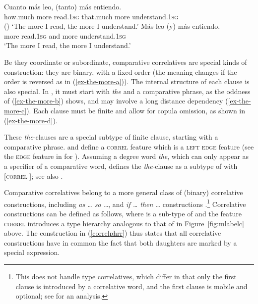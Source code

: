 \eal
\label{spanishab}
\ex 
\label{ex-spanish-a}
\gll Cuanto   m\'{a}s leo,     (tanto)        m\'{a}s entiendo. \\
     how.much more    read.1\textsc{sg} \hphantom{(}that.much more understand.1\textsc{sg} \\\hfill{()}
\glt `The more I read, the more I understand.'
\ex 
\label{ex-spanish-b}
\gll	M\'{a}s leo        (y) m\'{a}s entiendo.\\
	more read.1\textsc{sg} \hphantom{(}and more understand.1\textsc{sg} \\
\glt `The more I read, the more I understand.'\\ 
\zl

Be they coordinate or subordinate, comparative correlatives are special kinds of construction: they
are binary, with a fixed order (the meaning changes if the order is reversed as in
(\ref{ex-the-more-a})). The internal structure of each clause is also special. In , it
must start with \emph{the} and a comparative phrase, as the oddness of (\ref{ex-the-more-b}) shows,
and may involve a long distance dependency (\ref{ex-the-more-c}). Each clause must be finite and
allow for copula omission, as shown in (\ref{ex-the-more-d}).

\eal
\label{intell}
\zl

These \emph{the}-clauses  are a special subtype of finite clause, starting with a comparative
phrase. \citet[]{Abeille:Borsley:Espinal:06} and \citet[]{Borsley:11} 
define a \textsc{correl} feature which is a \textsc{left edge} feature (see the \textsc{edge}
feature in \citealt{Bonami:2004} for  ). Assuming a degree word \textit{the}, which can only appear as a specifier of
a comparative word, \citet[]{Borsley:11}  defines the \textit{the}-clause as a subtype of  with [\textsc{correl} ]; see also \citet[]{fgsag08}.

Comparative correlatives belong to a more general class of (binary) correlative constructions, including \emph{as \ldots{} so \ldots{}},
and \emph{if \ldots{} then  \ldots{}} constructions  
\parencites[Section~3.2]{Borsley:04}[--18]{Borsley:11}.\footnote{This does not handle  type correlatives, which differ in that  only the first clause is introduced by a correlative word, and the first clause is mobile and optional; see \citet[228]{pollardsag} for an analysis.}
Correlative constructions can be defined as follows, 
where  is a sub-type of 
 and the feature \textsc{correl} introduces a  type
hierarchy analogous to that of  in Figure~\ref{fig:mlabelc} above.
The construction in (\ref{correlphrr}) thus states that all correlative
constructions have in common the fact that both daughters are marked by a special expression. 

